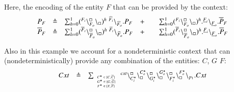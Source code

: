 Here, the encoding of the entity $F$ that can be provided by the context:
\[
\begin{array}{lcllcl}
P_F&\triangleq & \sum_{h=0}^1 ({}^{F_i}\backslash_{F_o}^{\scriptstyle {\square}}\backslash_{\scriptstyle {\square}})^h\ {}^{\widehat{F}_i} \backslash_{\widehat{F}_o}.P_F
& +  && \sum_{h=0}^1 ({}^{F_i}\backslash_{F_o}^{\scriptstyle {\square}}\backslash_{\scriptstyle {\square}})^h. {}^{\underline{F}_i} \backslash_{\underline{F}_o}.\overline{P}_F \\
\overline{P}_F&\triangleq & \sum_{h=0}^1 ({}^{\overline{F}_i}\backslash_{\overline{F}_o}^{\scriptstyle {\square}}\backslash_{\scriptstyle {\square}})^h\ {}^{\widehat{F}_i} \backslash_{\widehat{F}_o}.P_F
& +  && \sum_{h=0}^1 ({}^{\overline{F}_i}\backslash_{\overline{F}_o}^{\scriptstyle {\square}}\backslash_{\scriptstyle {\square}})^h. {}^{\underline{F}_i} \backslash_{\underline{F}_o}.\overline{P}_F \\
\end{array}
\]

Also in this example we account for a nondeterministic context that can (nondeterministically) provide any combination of the entities: $C$, $G$ $F$:
\[
\begin{array}{lcl}
 Cxt & \triangleq &
 \sum_{\tiny \begin{array}{l}C^{\star} \in \{C,\overline{C}\}\\G^{\star} \in \{G,\overline{G}\}\\
 F^{\star} \in \{F,\overline{F}\}
  \end{array}}
 {}^{cxt} \backslash_{C_i^{\star}}^{\scriptstyle {\square}}\backslash_{\scriptstyle {\square}}^{C_o^{\star}}\backslash_{G_i^{\star}}^{\scriptstyle {\square}}\backslash_{\scriptstyle {\square}}^{G_o^{\star}}
 \backslash_{F_i^{\star}}^{\scriptstyle {\square}}\backslash_{\scriptstyle {\square}}^{F_o^{\star}}\backslash_{p_1}.Cxt\\
\end{array}
\]

